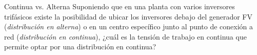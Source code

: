 \documentclass[xcolor={usenames,svgnames,dvipsnames}]{beamer}
\begin{document}
\begin{frame}[label=sec-3-0-5]{Continua vs. Alterna}
Suponiendo que en una planta con varios inversores trifásicos existe la
posibilidad de ubicar los inversores debajo del generador FV
(\emph{distribución en alterna}) o en un centro específico junto al punto de
conexión a red (\emph{distribución en continua}), \alert{¿cuál es la tensión de
trabajo en continua que permite optar por una distribución en continua?}
\end{frame}
\end{document}
